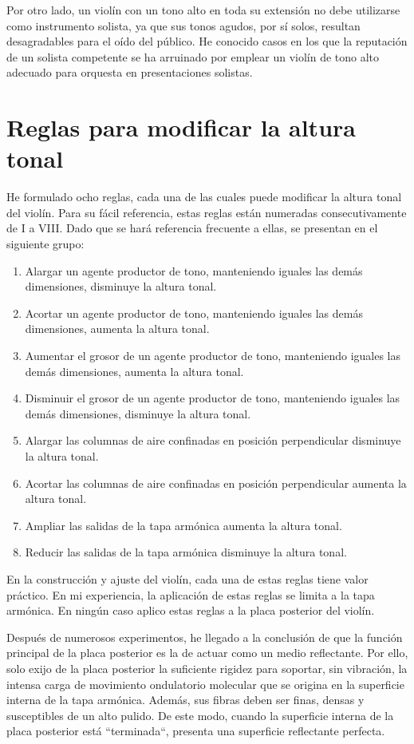 \documentclass[12pt]{book}
\begin{document}
Por otro lado, un violín con un tono alto en toda su extensión no debe utilizarse como instrumento solista, ya que sus tonos agudos, por sí solos, resultan desagradables para el oído del público. He conocido casos en los que la reputación de un solista competente se ha arruinado por emplear un violín de tono alto adecuado para orquesta en presentaciones solistas.

\section*{Reglas para modificar la altura tonal}

He formulado ocho reglas, cada una de las cuales puede modificar la altura tonal del violín. Para su fácil referencia, estas reglas están numeradas consecutivamente de I a VIII. Dado que se hará referencia frecuente a ellas, se presentan en el siguiente grupo:

\begin{enumerate}
  \item Alargar un agente productor de tono, manteniendo iguales las demás dimensiones, disminuye la altura tonal.
  \item Acortar un agente productor de tono, manteniendo iguales las demás dimensiones, aumenta la altura tonal.
  \item Aumentar el grosor de un agente productor de tono, manteniendo iguales las demás dimensiones, aumenta la altura tonal.
  \item Disminuir el grosor de un agente productor de tono, manteniendo iguales las demás dimensiones, disminuye la altura tonal.
  \item Alargar las columnas de aire confinadas en posición perpendicular disminuye la altura tonal.
  \item Acortar las columnas de aire confinadas en posición perpendicular aumenta la altura tonal.
  \item Ampliar las salidas de la tapa armónica aumenta la altura tonal.
  \item Reducir las salidas de la tapa armónica disminuye la altura tonal.
\end{enumerate}

En la construcción y ajuste del violín, cada una de estas reglas tiene valor práctico. En mi experiencia, la aplicación de estas reglas se limita a la tapa armónica. En ningún caso aplico estas reglas a la placa posterior del violín.

Después de numerosos experimentos, he llegado a la conclusión de que la función principal de la placa posterior es la de actuar como un medio reflectante. Por ello, solo exijo de la placa posterior la suficiente rigidez para soportar, sin vibración, la intensa carga de movimiento ondulatorio molecular que se origina en la superficie interna de la tapa armónica. Además, sus fibras deben ser finas, densas y susceptibles de un alto pulido. De este modo, cuando la superficie interna de la placa posterior está ``terminada``, presenta una superficie reflectante perfecta.
\end{document}
